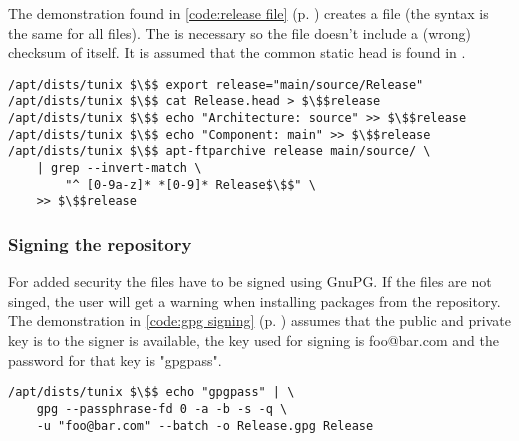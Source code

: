 The demonstration found in \lstlistingname{} \ref{code:release file} (p.
\pageref{code:release file}) creates a  file (the syntax is the
same for all files). The  is
necessary so the file doesn't include a (wrong) checksum of itself. It is
assumed that the common static head is found in .
\begin{lstlisting}[label=code:release file, caption=Creating a Release file,
float=ht]
/apt/dists/tunix $\$$ export release="main/source/Release"
/apt/dists/tunix $\$$ cat Release.head > $\$$release
/apt/dists/tunix $\$$ echo "Architecture: source" >> $\$$release
/apt/dists/tunix $\$$ echo "Component: main" >> $\$$release
/apt/dists/tunix $\$$ apt-ftparchive release main/source/ \
	| grep --invert-match \
		"^ [0-9a-z]* *[0-9]* Release$\$$" \
	>> $\$$release
\end{lstlisting}

\subsubsection{Signing the repository}
For added security the  files have to be signed using GnuPG. If
the files are not singed, the user will get a warning when installing packages
from the repository. The demonstration in \lstlistingname{} \ref{code:gpg
signing} (p. \pageref{code:gpg signing}) assumes that the public and private key
is to the signer is available, the key used for signing is foo@bar.com and the
password for that key is "gpgpass".
\begin{lstlisting}[label=code:gpg signing, caption=Signing a Release file,
float=ht]
/apt/dists/tunix $\$$ echo "gpgpass" | \
	gpg --passphrase-fd 0 -a -b -s -q \
	-u "foo@bar.com" --batch -o Release.gpg Release
\end{lstlisting}
